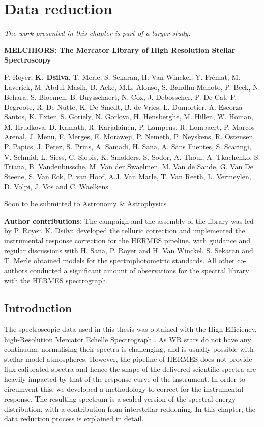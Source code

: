 \chapter{Data reduction} \label{ch:data_reduction}

\textit{The work presented in this chapter is part of a larger study:}

\textbf{MELCHIORS: The Mercator Library of High Resolution Stellar Spectroscopy}

P. Royer, \textbf{K. Dsilva}, T. Merle, S. Sekaran, H. Van Winckel, Y. Fr\'emat, M. Laverick, M. Abdul Masih, B. Acke, M.L. Alonso, S. Bandhu Mahoto, P. Beck, N. Behara, S. Bloemen, B. Buysschaert, N. Cox, J. Debosscher, P. De Cat, P. Degroote, R. De Nutte, K. De Smedt, B. de Vries, L. Dumortier, A. Escorza Santos, K. Exter, S. Goriely, N. Gorlova, H. Hensberghe, M. Hillen, W. Homan, M. Hrudkova, D. Kamath, R. Karjalainen, P. Lampens, R. Lombaert, P. Marcos Arenal, J. Menu, F. Merges, E. Moraweji, P. Nemeth, P. Neyskens, R. Ostensen, P. Papics, J. Perez, S. Prins, A. Samadi, H. Sana, A. Sans Fuentes, S. Scaringi, V. Schmid, L. Siess, C. Siopis, K. Smolders, S. Sodor, A. Thoul, A. Tkachenko, S. Triana, B. Vandenbussche, M. Van der Swaelmen, M. Van de Sande, G. Van De Steene, S. Van Eck, P. van Hoof, A.J. Van Marle, T. Van Reeth, L. Vermeylen, D. Volpi, J. Vos and C. Waelkens

Soon to be submitted to Astronomy \& Astrophysics

\textbf{Author contributions:} The campaign and the assembly of the library was led by P. Royer. K. Dsilva developed the telluric correction and implemented the instrumental response correction for the HERMES pipeline, with guidance and regular discussions with H. Sana, P. Royer and H. Van Winckel. S. Sekaran and T. Merle obtained models for the spectrophotometric standards. All other co-authors conducted a significant amount of observations for the spectral library with the HERMES spectrograph. 

\section{Introduction}

The spectroscopic data used in this thesis was obtained with the High Efficiency, high-Resolution Mercator Echelle Spectrograph \citep[HERMES,][]{raskin_hermes_2011}. As WR stars do not have any continuum, normalising their spectra is challenging, and is usually possible with stellar model atmospheres. However, the pipeline of HERMES does not provide flux-calibrated spectra and hence the shape of the delivered scientific spectra are heavily impacted by that of the response curve of the instrument. In order to circumvent this, we developed a methodology to correct for the instrumental response. The resulting spectrum is a scaled version of the spectral energy distribution, with a contribution from interstellar reddening. In this chapter, the data reduction process is explained in detail. 


